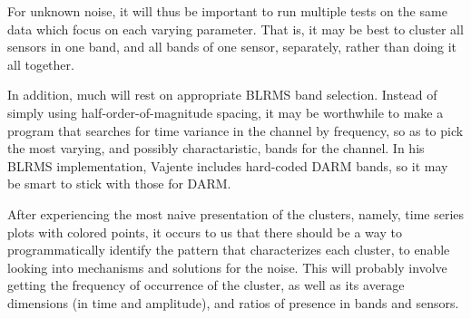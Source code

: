 \documentclass[colorlinks=true,pdfstartview=FitV,linkcolor=blue,
            citecolor=red,urlcolor=magenta]{ligodoc}
\begin{document}
For unknown noise, it will thus be important to run multiple tests on the same data which focus on each varying parameter.
That is, it may be best to cluster all sensors in one band, and all bands of one sensor, separately, rather than doing it all together.

In addition, much will rest on appropriate BLRMS band selection.
Instead of simply using half-order-of-magnitude spacing, it may be worthwhile to make a program that searches for time variance in the channel by frequency, so as to pick the most varying, and possibly charactaristic, bands for the channel.
In his BLRMS implementation, Vajente includes hard-coded DARM bands, so it may be smart to stick with those for DARM\cite{vajente}.

After experiencing the most naive presentation of the clusters, namely, time series plots with colored points, it occurs to us that there should be a way to programmatically identify the pattern that characterizes each cluster, to enable looking into mechanisms and solutions for the noise.
This will probably involve getting the frequency of occurrence of the cluster, as well as its average dimensions (in time and amplitude), and ratios of presence in bands and sensors.


\end{document}
